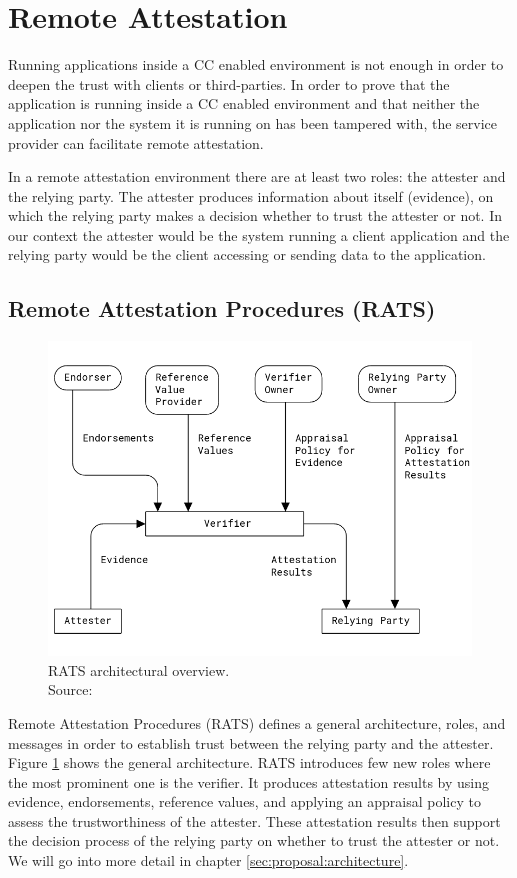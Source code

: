 \section{Remote Attestation}
\label{ch:remote-attestation}

Running applications inside a CC enabled environment is not enough in order to
deepen the trust with clients or third-parties. In order to prove that the
application is running inside a CC enabled environment and that neither the
application nor the system it is running on has been tampered with, the service
provider can facilitate remote attestation.

In a remote attestation environment there are at least two roles: the attester
and the relying party. The attester produces information about itself
(evidence), on which the relying party makes a decision whether to trust the
attester or not. In our context the attester would be the system running a
client application and the relying party would be the client accessing or
sending data to the application.

\subsection{Remote Attestation Procedures (RATS)}
\label{sec:rats}

\begin{figure}
  \centering
  \includegraphics[width=0.7\linewidth]{resources/rats-architecture.png}
  \caption[RATS architectural overview]{
    RATS architectural overview.\\
    Source:  \cite{rfc9334}
  }
  \label{figure:rats-architecture}
\end{figure}

Remote Attestation Procedures (RATS) defines a general architecture, roles, and
messages in order to establish trust between the relying party and the attester.
Figure \ref{figure:rats-architecture} shows the general architecture. RATS
introduces few new roles where the most prominent one is the verifier. It
produces attestation results by using evidence, endorsements, reference values,
and applying an appraisal policy to assess the trustworthiness of the attester.
These attestation results then support the decision process of the relying party
on whether to trust the attester or not. We will go into more detail in chapter
\ref{sec:proposal:architecture}.
